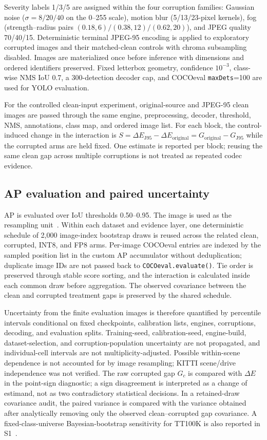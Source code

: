 \documentclass[a4paper,fleqn]{cas-dc}
\begin{document}
Severity labels 1/3/5 are assigned within the four corruption families: Gaussian noise ($\sigma=8/20/40$ on the 0--255 scale), motion blur (5/13/23-pixel kernels), fog (strength--radius pairs $(0.18,6)/(0.38,12)/(0.62,20)$), and JPEG quality 70/40/15. Deterministic terminal JPEG-95 encoding is applied to exploratory corrupted images and their matched-clean controls with chroma subsampling disabled. Images are materialized once before inference with dimensions and ordered identifiers preserved. Fixed letterbox geometry, confidence $10^{-3}$, class-wise NMS IoU 0.7, a 300-detection decoder cap, and COCOeval \texttt{maxDets}=100 are used for YOLO evaluation.

For the controlled clean-input experiment, original-source and JPEG-95 clean images are passed through the same engine, preprocessing, decoder, threshold, NMS, annotations, class map, and ordered image list. For each block, the control-induced change in the interaction is $S=\Delta E_{\mathrm{J95}}-\Delta E_{\mathrm{original}}=G_{\mathrm{original}}-G_{\mathrm{J95}}$ while the corrupted arms are held fixed. One estimate is reported per block; reusing the same clean gap across multiple corruptions is not treated as repeated codec evidence.

\subsection{AP evaluation and paired uncertainty}
\label{sec:uncertainty}

AP is evaluated over IoU thresholds 0.50--0.95. The image is used as the resampling unit~\citep{efron1979bootstrap}. Within each dataset and evidence layer, one deterministic schedule of 2,000 image-index bootstrap draws is reused across the related clean, corrupted, INT8, and FP8 arms. Per-image COCOeval entries are indexed by the sampled position list in the custom AP accumulator without deduplication; duplicate image IDs are not passed back to \texttt{COCOeval.evaluate()}. Tie order is preserved through stable score sorting, and the interaction is calculated inside each common draw before aggregation. The observed covariance between the clean and corrupted treatment gaps is preserved by the shared schedule.

Uncertainty from the finite evaluation images is therefore quantified by percentile intervals conditional on fixed checkpoints, calibration lists, engines, corruptions, decoding, and evaluation splits. Training-seed, calibration-seed, engine-build, dataset-selection, and corruption-population uncertainty are not propagated, and individual-cell intervals are not multiplicity-adjusted. Possible within-scene dependence is not accounted for by image resampling; KITTI scene/drive independence was not verified. The raw corrupted gap $G_c$ is compared with $\Delta E$ in the point-sign diagnostic; a sign disagreement is interpreted as a change of estimand, not as two contradictory statistical decisions. In a retained-draw covariance audit, the paired variance is compared with the variance obtained after analytically removing only the observed clean--corrupted gap covariance. A fixed-class-universe Bayesian-bootstrap sensitivity for TT100K is also reported in S1~\citep{rubin1981bayesian}.
\end{document}
